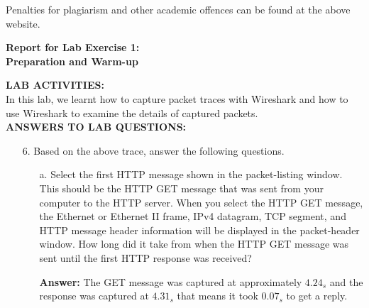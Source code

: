 \documentclass[12pt,letterpaper]{article}
\begin{document}
Penalties for plagiarism and other academic offences can be found at the above website.



\newpage
\begin{center}
    \Large \bf Report for Lab Exercise 1:\\Preparation and Warm-up \vspace*{12pt}
\end{center}


{\bf LAB ACTIVITIES:}
\\

In this lab, we learnt how to capture packet traces with Wireshark and how to use Wireshark to examine
the details of captured packets.
\\

{\bf ANSWERS TO LAB QUESTIONS:}

\begin{enumerate}
    \item[6.] Based on the above trace, answer the following questions.
    \begin{enumerate}
        \item[a.] Select the first HTTP message shown in the packet-listing window. This should be the HTTP GET
message that was sent from your computer to the HTTP server. When you select the HTTP GET
message, the Ethernet or Ethernet II frame, IPv4 datagram, TCP segment, and HTTP message
header information will be displayed in the packet-header window. How long did it take from
when the HTTP GET message was sent until the first HTTP response was received?

        {\bf Answer:} The GET message was captured at approximately $4.24_s$ and the response was captured at $4.31_s$ that means it took $0.07_s$ to get a reply.
    \end{enumerate}
\end{enumerate}



\end{document}
